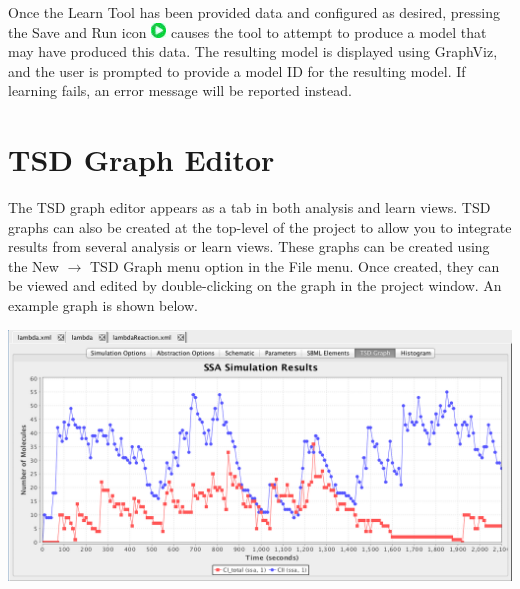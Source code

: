 \documentclass[titlepage,11pt]{article}
\begin{document}
Once the Learn Tool has been provided data and configured as desired, pressing the Save and Run icon \includegraphics{../gui/icons/run-icon} causes the tool to attempt to produce a model that may have produced this data.  The resulting model is displayed using GraphViz, and the user is prompted to provide a model ID for the resulting model.  If learning fails, an error message will be reported instead.

\clearpage

\section{\label{TSDGraph}TSD Graph Editor}

\noindent
The TSD graph editor appears as a tab in both analysis and learn views.  TSD graphs can also be created at the top-level of the project to allow you to integrate results from several analysis or learn views. These graphs can be created using the New $\rightarrow$ TSD Graph menu option in the File menu. Once created, they can be viewed and edited by double-clicking on the graph in the project window.  An example graph is shown below.

\begin{center}
\includegraphics[width=160mm]{screenshots/ssaSimResults}
\end{center}
\end{document}
